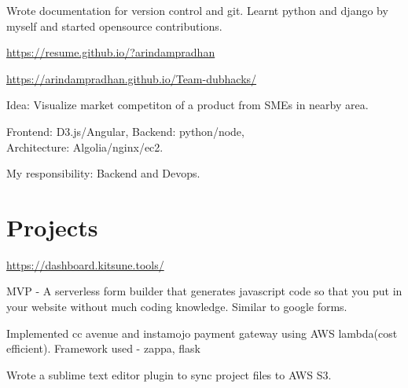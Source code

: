 \documentclass[]{deedy-resume-openfont}
\begin{document}
\begin{minipage}[t]{0.66\textwidth}
\vspace{\topsep} %
\begin{tightemize}
\item Wrote documentation for version control and git. Learnt python and django by myself and started opensource contributions.\end{tightemize}
\sectionsep


{ \url{https://resume.github.io/?arindampradhan } }\\
\sectionsep

{ \url{https://arindampradhan.github.io/Team-dubhacks/} }\\
\begin{tightemize}
\item Idea: Visualize market competiton of a product from SMEs in nearby area.
\item Frontend: D3.js/Angular,  Backend: python/node, \\ Architecture: Algolia/nginx/ec2.
\item My responsibility: Backend and Devops.
\vspace{\topsep} %
\end{tightemize}

\section{Projects}

{ \url{https://dashboard.kitsune.tools/} }\\
\begin{tightemize}
\item MVP - A serverless form builder that generates javascript code so that you put in your website without much coding knowledge. Similar to google forms.
\vspace{\topsep} %
\end{tightemize}

\begin{tightemize}
\item Implemented cc avenue and instamojo payment gateway using AWS lambda(cost efficient). Framework used - zappa, flask
\item Wrote a sublime text editor plugin to sync project files to AWS S3.
\vspace{\topsep} %
\end{tightemize}


\end{minipage}
\end{document}
